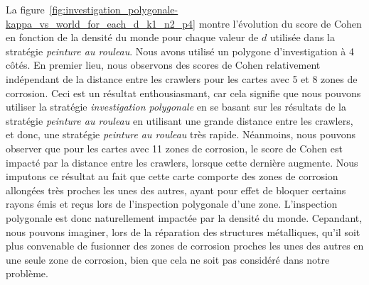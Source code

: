 \documentclass[francais,RandD]{rapportPFE}
\begin{document}
			La figure~\ref{fig:investigation_polygonale-kappa_vs_world_for_each_d_k1_n2_p4} montre l'évolution du score de Cohen en fonction de la densité du monde pour chaque valeur de $d$ utilisée dans la stratégie \textit{peinture au rouleau}.
			Nous avons utilisé un polygone d'investigation à 4 côtés.
			En premier lieu, nous observons des scores de Cohen relativement indépendant de la distance entre les crawlers pour les cartes avec 5 et 8 zones de corrosion.
			Ceci est un résultat enthousiasmant, car cela signifie que nous pouvons utiliser la stratégie \textit{investigation polygonale} en se basant sur les résultats de la stratégie \textit{peinture au rouleau} en utilisant une grande distance entre les crawlers, et donc, une stratégie \textit{peinture au rouleau} très rapide.
			Néanmoins, nous pouvons observer que pour les cartes avec 11 zones de corrosion, le score de Cohen est impacté par la distance entre les crawlers, lorsque cette dernière augmente.
			Nous imputons ce résultat au fait que cette carte comporte des zones de corrosion allongées très proches les unes des autres, ayant pour effet de bloquer certains rayons émis et reçus lors de l'inspection polygonale d'une zone.
			L'inspection polygonale est donc naturellement impactée par la densité du monde.
			Cepandant, nous pouvons imaginer, lors de la réparation des structures métalliques, qu'il soit plus convenable de fusionner des zones de corrosion proches les unes des autres en une seule zone de corrosion, bien que cela ne soit pas considéré dans notre problème.
\end{document}
